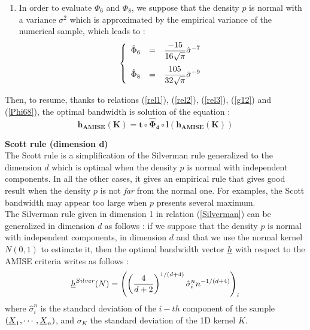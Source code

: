 {\begin{enumerate}
  \item In order to evaluate $\Phi_6$ and $\Phi_8$, we suppose that the density $p$ is normal with a variance $\sigma^2$ which is approximated by the empirical variance of the numerical sample, which leads to :
    \begin{equation}
      \label{Phi68}
      \left\{
        \begin{array}{lcl}
          \hat{\Phi}_6 & = & \displaystyle \frac{-15}{16\sqrt{\pi}}\hat{\sigma}^{-7}\\
          \hat{\Phi}_8 & = & \displaystyle \frac{105^{\strut}}{32\sqrt{\pi}}\hat{\sigma}^{-9}
        \end{array}
      \right.
    \end{equation}
  \end{enumerate}

  Then, to resume, thanks to relations (\ref{rel1}), (\ref{rel2}), (\ref{rel3}), (\ref{g12}) and (\ref{Phi68}), the optimal bandwidth is solution of the equation :
  \begin{equation}
    \label{equhAmise}
    \boldsymbol{h_{AMISE}(K) = t \circ \hat{\Phi}_4 \circ l (h_{AMISE}(K))}
  \end{equation}





  \vspace*{0.5cm}


  \textbf{Scott rule (dimension d)}\\

  The Scott rule is a simplification of the Silverman rule generalized to the dimension $d$ which is optimal when the density $p$ is normal with independent components. In all the other cases, it gives an empirical rule that gives good result when the density $p$ is not \emph{far} from the normal one. For examples, the Scott bandwidth may appear too large when $p$ presents several maximum.\\

  The Silverman rule given in dimension 1 in relation (\ref{Silverman}) can be generalized in dimension $d$ as follows : if we suppose  that the density $p$ is normal with independent components, in dimension $d$ and that we use the normal kernel $N(0,1)$ to estimate it, then the optimal bandwidth vector ${\underline{h}}$ with respect to the AMISE criteria writes as follows :
  \begin{equation}
    \label{SilvermanNormalKernel}
    {\underline{h}}^{Silver}(N) = \left(\left(\frac{4}{d+2}\right)^{1/(d+4)}\hat{\sigma}_i^n n^{-1/(d+4)}\right)_i
  \end{equation}
  where $\hat{\sigma}_i^n$ is the standard deviation of the $i-th$ component of the sample $({\underline{X}}_1, \cdots, {\underline{X}}_n)$, and $\sigma_K$ the standard deviation of the 1D kernel $K$.\\



}

